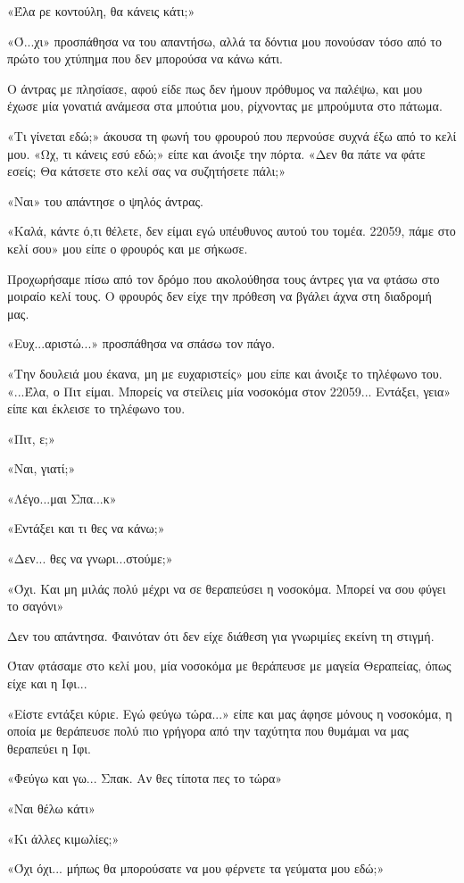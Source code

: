 \documentclass[12pt,twoside, openany]{book}
\begin{document}
«Έλα ρε κοντούλη, θα κάνεις κάτι;»

«Ό...χι» προσπάθησα να του απαντήσω, αλλά τα δόντια μου πονούσαν τόσο από το πρώτο του χτύπημα που δεν μπορούσα να κάνω κάτι.

Ο άντρας με πλησίασε, αφού είδε πως δεν ήμουν πρόθυμος να παλέψω, και μου έχωσε μία γονατιά ανάμεσα στα μπούτια μου, ρίχνοντας με μπρούμυτα στο πάτωμα.

«Τι γίνεται εδώ;» άκουσα τη φωνή του φρουρού που περνούσε συχνά έξω από το κελί μου. «Ωχ, τι κάνεις εσύ εδώ;» είπε και άνοιξε την πόρτα. «Δεν θα πάτε να φάτε εσείς; Θα κάτσετε στο κελί σας να συζητήσετε πάλι;»

«Ναι» του απάντησε ο ψηλός άντρας.

«Καλά, κάντε ό,τι θέλετε, δεν είμαι εγώ υπέυθυνος αυτού του τομέα. 22059, πάμε στο κελί σου» μου είπε ο φρουρός και με σήκωσε.

Προχωρήσαμε πίσω από τον δρόμο που ακολούθησα τους άντρες για να φτάσω στο μοιραίο κελί τους. Ο φρουρός δεν είχε την πρόθεση να βγάλει άχνα στη διαδρομή μας.

«Ευχ...αριστώ...» προσπάθησα να σπάσω τον πάγο.

«Την δουλειά μου έκανα, μη με ευχαριστείς» μου είπε και άνοιξε το τηλέφωνο του. «...Έλα, ο Πιτ είμαι. Μπορείς να στείλεις μία νοσοκόμα στον 22059... Εντάξει, γεια» είπε και έκλεισε το τηλέφωνο του.

«Πιτ, ε;»

«Ναι, γιατί;»

«Λέγο...μαι Σπα...κ»

«Εντάξει και τι θες να κάνω;»

«Δεν... θες να γνωρι...στούμε;»

«Όχι. Και μη μιλάς πολύ μέχρι να σε θεραπεύσει η νοσοκόμα. Μπορεί να σου φύγει το σαγόνι»

Δεν του απάντησα. Φαινόταν ότι δεν είχε διάθεση για γνωριμίες εκείνη τη στιγμή.

Όταν φτάσαμε στο κελί μου, μία νοσοκόμα με θεράπευσε με μαγεία Θεραπείας, όπως είχε και η Ιφι... 

«Είστε εντάξει κύριε. Εγώ φεύγω τώρα...» είπε και μας άφησε μόνους η νοσοκόμα, η οποία με θεράπευσε πολύ πιο γρήγορα από την ταχύτητα που θυμάμαι να μας θεραπεύει η Ιφι.

«Φεύγω και γω... Σπακ. Αν θες τίποτα πες το τώρα»

«Ναι θέλω κάτι»

«Κι άλλες κιμωλίες;»

«Όχι όχι... μήπως θα μπορούσατε να μου φέρνετε τα γεύματα μου εδώ;»
\end{document}
